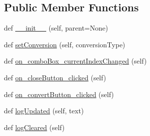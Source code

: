 \subsection*{Public Member Functions}
\begin{DoxyCompactItemize}
\item 
def \mbox{\hyperlink{class_dsg_tools_1_1_conversion_tools_1_1convert__database_1_1_convert_database_a2ae9c370848e6747a2c5a0df798e4006}{\+\_\+\+\_\+init\+\_\+\+\_\+}} (self, parent=None)
\item 
def \mbox{\hyperlink{class_dsg_tools_1_1_conversion_tools_1_1convert__database_1_1_convert_database_ac695f8034904ba190770122f26bfafa3}{set\+Conversion}} (self, conversion\+Type)
\item 
def \mbox{\hyperlink{class_dsg_tools_1_1_conversion_tools_1_1convert__database_1_1_convert_database_a8082ef2aa0afb9d44f39c8192bb74d3b}{on\+\_\+combo\+Box\+\_\+current\+Index\+Changed}} (self)
\item 
def \mbox{\hyperlink{class_dsg_tools_1_1_conversion_tools_1_1convert__database_1_1_convert_database_a19d11248681c05374b99a463ffa65680}{on\+\_\+close\+Button\+\_\+clicked}} (self)
\item 
def \mbox{\hyperlink{class_dsg_tools_1_1_conversion_tools_1_1convert__database_1_1_convert_database_a17a29f0021797382f0c379c95a989ff7}{on\+\_\+convert\+Button\+\_\+clicked}} (self)
\item 
def \mbox{\hyperlink{class_dsg_tools_1_1_conversion_tools_1_1convert__database_1_1_convert_database_a715b01476121b47d1595f88649eb1428}{log\+Updated}} (self, text)
\item 
def \mbox{\hyperlink{class_dsg_tools_1_1_conversion_tools_1_1convert__database_1_1_convert_database_a1fdc07691550f2c4fc363b60ab454c0b}{log\+Cleared}} (self)
\end{DoxyCompactItemize}

